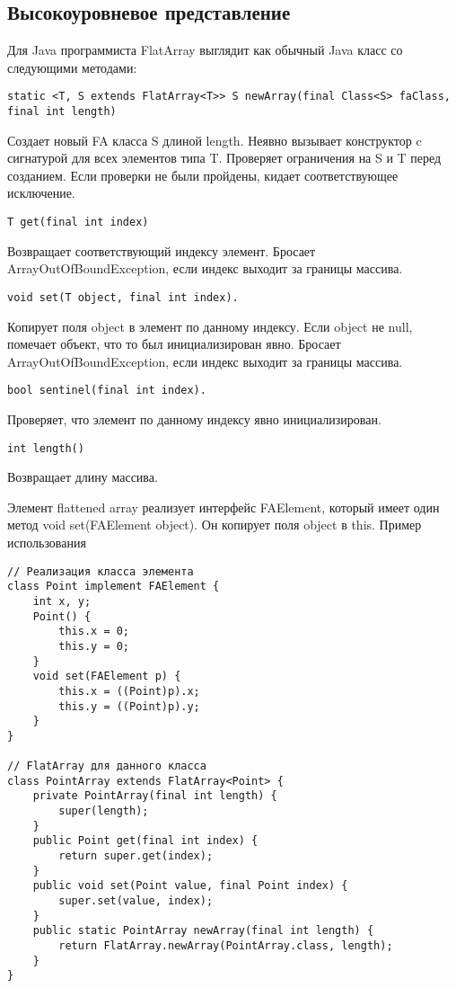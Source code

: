 \subsection{Высокоуровневое представление}
Для Java программиста FlatArray выглядит как обычный Java класс со следующими методами:
\begin{lstlisting}
static <T, S extends FlatArray<T>> S newArray(final Class<S> faClass, final int length)
\end{lstlisting}
Создает новый FA класса S длиной length. Неявно вызывает конструктор c сигнатурой для всех элементов типа T. Проверяет ограничения на S и T перед созданием. Если проверки не были пройдены, кидает соответствующее исключение.
\begin{lstlisting}
T get(final int index)
\end{lstlisting}
Возвращает соответствующий индексу элемент. Бросает ArrayOutOfBoundException, если индекс выходит за границы массива.
\begin{lstlisting}
void set(T object, final int index).
\end{lstlisting}
Копирует поля object в элемент по данному индексу. Если object не null, помечает объект, что то был инициализирован явно. Бросает ArrayOutOfBoundException, если индекс выходит за границы массива.
\begin{lstlisting}
bool sentinel(final int index).
\end{lstlisting}
Проверяет, что элемент по данному индексу явно инициализирован.
\begin{lstlisting}
int length()
\end{lstlisting}
Возвращает длину массива. 
\par
Элемент flattened array реализует интерфейс FAElement, который имеет один метод void set(FAElement object). Он копирует поля object в this. 
Пример использования
\begin{lstlisting}
// Реализация класса элемента
class Point implement FAElement {
	int x, y;
	Point() {
		this.x = 0; 
		this.y = 0; 
	}
	void set(FAElement p) { 
		this.x = ((Point)p).x; 
		this.y = ((Point)p).y; 
	}
}

// FlatArray для данного класса
class PointArray extends FlatArray<Point> {
	private PointArray(final int length) { 
		super(length); 
	}
	public Point get(final int index) { 
		return super.get(index); 
	}
	public void set(Point value, final Point index) { 
		super.set(value, index); 
	}
	public static PointArray newArray(final int length) { 
		return FlatArray.newArray(PointArray.class, length); 
	}
}
\end{lstlisting}

